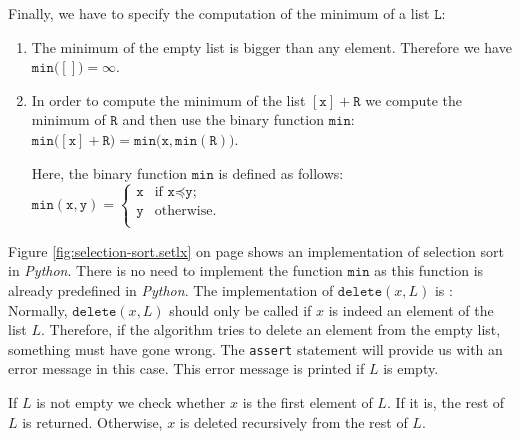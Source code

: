 Finally, we have to specify the computation of the minimum of a list $\texttt{L}$:
\begin{enumerate}
\item The minimum of the empty list is bigger than any element.  Therefore we have 
      \\[0.2cm]
      \hspace*{1.3cm} $\mathtt{min}\bigl([]\bigr) = \infty$.
\item In order to compute the minimum of the list $[\texttt{x}] + \texttt{R}$ we compute the minimum of $\texttt{R}$ and
      then use the binary function $\mathtt{min}$: \\[0.2cm]
      \hspace*{1.3cm} 
      $\mathtt{min}\bigl([\texttt{x}] + \texttt{R}\bigr) = \mathtt{min}\bigl(\texttt{x}, \mathtt{min}(\texttt{R}) \bigr)$. 

      Here, the binary function $\mathtt{min}$ is defined as follows: \\[0.2cm]
      \hspace*{1.3cm} 
      $\mathtt{min}(\texttt{x},\texttt{y}) = \left\{
      \begin{array}{ll}
        \texttt{x}  & \mbox{if $\texttt{x} \preceq \texttt{y}$;} \\
        \texttt{y}  & \mbox{otherwise.} \\
      \end{array}\right.
      $
\end{enumerate}
Figure \ref{fig:selection-sort.setlx} on page \pageref{fig:selection-sort.setlx} shows an
implementation of selection sort in \textsl{Python}.  There is no need to implement the function
$\mathtt{min}$ as this function is already predefined in \textsl{Python}. 
The implementation of $\mathtt{delete}(x,L)$ is :  Normally, $\mathtt{delete}(x, L)$
should only be called if $x$ is indeed an element of the list $L$.   Therefore, if the algorithm tries 
to delete an element from the empty list, something must have gone wrong.  The \texttt{assert}
statement will provide us with an error message in this case.  This error message is printed if $L$ is empty.

If $L$ is not empty we check whether $x$ is the first element of $L$.  If it is, the rest of $L$ is
returned.  Otherwise, $x$ is deleted recursively from the rest of $L$.



